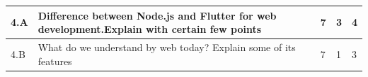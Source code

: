 \documentclass[12pt]{article}
\begin{document}
\begin{tabular}{|L{1cm}|L{9cm}|C{2cm}|C{2cm}|C{1cm}|}
		4.A &
	Difference between Node.js and Flutter for web development.Explain with certain few points \newline
			
	 &  7 & 3 & 4\\ \hline
		4.B &
	What do we understand by web today? Explain some of its features \newline
			
	 &  7 & 1 & 3\\ \hline
	\end{tabular}
\end{document}

